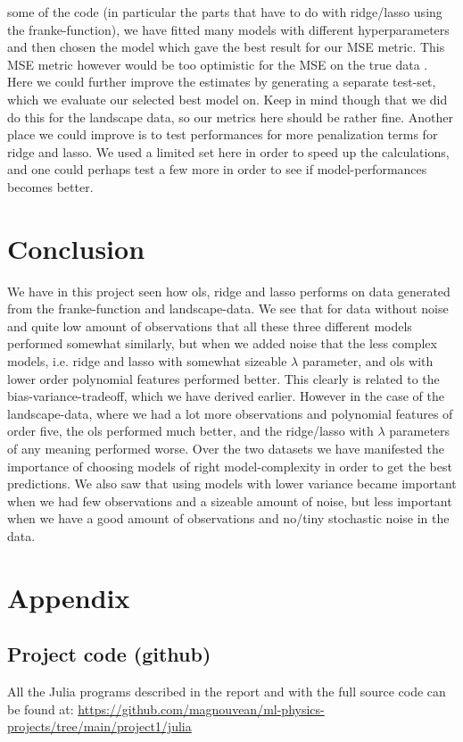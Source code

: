 \documentclass{article}
\begin{document}
some of the code (in particular the parts that have to do with ridge/lasso using
the franke-function), we have fitted many models with different hyperparameters
and then chosen the model which gave the best result for our MSE metric. This
MSE metric however would be too optimistic for the MSE on the true data
\cite[s.~7.2]{hastie2009elements}.  Here we could further improve the estimates
by generating a separate test-set, which we evaluate our selected best model on.
Keep in mind though that we did do this for the landscape data, so our metrics
here should be rather fine. Another place we could improve is to test
performances for more penalization terms for ridge and lasso. We used a limited
set here in order to speed up the calculations, and one could perhaps test a few
more in order to see if model-performances becomes better.

\section{Conclusion}
We have in this project seen how ols, ridge and lasso performs on data generated
from the franke-function and landscape-data. We see that for data without noise
and quite low amount of observations that all these three different models
performed somewhat similarly, but when we added noise that the less
complex models, i.e. ridge and lasso with somewhat sizeable $\lambda$ parameter,
and ols with lower order polynomial features performed better. This clearly is
related to the bias-variance-tradeoff, which we have derived earlier. However in
the case of the landscape-data, where we had a lot more observations and
polynomial features of order five, the ols performed much better, and the
ridge/lasso with $\lambda$ parameters of any meaning performed worse. Over the
two datasets we have manifested the importance of choosing models of right
model-complexity in order to get the best predictions. We also saw that using
models with lower variance became important when we had few observations and a
sizeable amount of noise, but less important when we have a good amount of
observations and no/tiny stochastic noise in the data.

\section{Appendix}

\subsection{Project code (github)}
All the Julia programs described in the report and with the full source code can be
found at:
\url{https://github.com/magnouvean/ml-physics-projects/tree/main/project1/julia}
\end{document}
